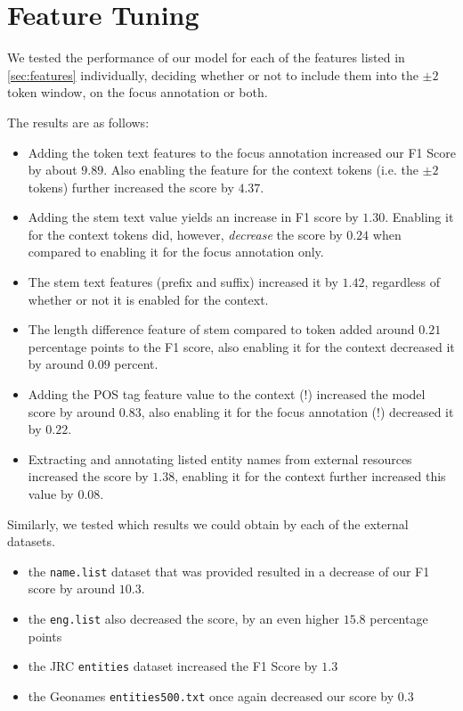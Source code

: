\documentclass{article}
\begin{document}
\section{Feature Tuning}
We tested the performance of our model for each of the features listed in \autoref{sec:features} individually, deciding whether or not to include them into the \(\pm 2\) token window, on the focus annotation or both.

The results are as follows:

\begin{itemize}
	\item
		Adding the token text features to the focus annotation increased our F1 Score by about \(9.89\). Also enabling the feature for the context tokens (i.e. the \(\pm 2\) tokens) further increased the score by \(4.37\).
	
	\item
		Adding the stem text value yields an increase in F1 score by \(1.30\).
		Enabling it for the context tokens did, however, \emph{decrease} the score by \(0.24\) when compared to enabling it for the focus annotation only.
	
	\item
		The stem text features (prefix and suffix) increased it by \(1.42\), regardless of whether or not it is enabled for the context.
	
	\item
		The length difference feature of stem compared to token added around \(0.21\) percentage points to the F1 score, also enabling it for the context decreased it by around \(0.09\) percent.
	
	\item
		Adding the POS tag feature value to the context (!) increased the model score by around \(0.83\), also enabling it for the focus annotation (!) decreased it by \(0.22\).
	
	\item
		Extracting and annotating listed entity names from external resources increased the score by \(1.38\), enabling it for the context further increased this value by \(0.08\).
\end{itemize}

Similarly, we tested which results we could obtain by each of the external datasets.
\begin{itemize}
	\item the \texttt{name.list} dataset that was provided resulted in a decrease of our F1 score by around \(10.3\).
	\item the \texttt{eng.list} also decreased the score, by an even higher \(15.8\) percentage points
	\item the JRC \texttt{entities} dataset increased the F1 Score by \(1.3\)
	\item the Geonames \texttt{entities500.txt} once again decreased our score by \(0.3\)
\end{itemize}
\end{document}
